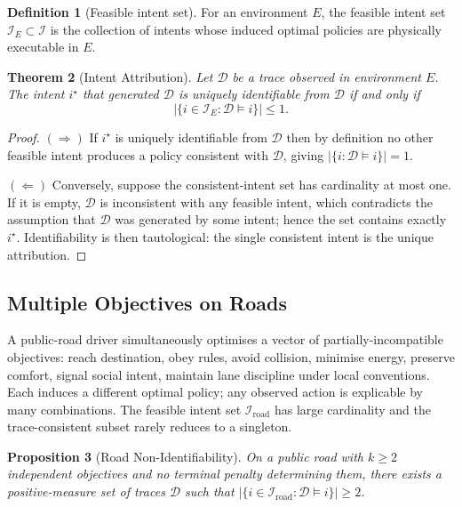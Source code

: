 \documentclass[11pt,twocolumn]{article}
\newtheorem{theorem}{Theorem}
\newtheorem{proposition}[theorem]{Proposition}
\theoremstyle{definition}
\newtheorem{definition}[theorem]{Definition}
\theoremstyle{remark}
\newcommand{\cI}{\mathcal{I}}
\begin{document}
\begin{definition}[Feasible intent set]\label{def:feasible-intents}
For an environment $E$, the feasible intent set $\cI_E \subset \cI$ is the collection of intents whose induced optimal policies are physically executable in $E$.
\end{definition}

\begin{theorem}[Intent Attribution]\label{thm:intent}
Let $\mathcal{D}$ be a trace observed in environment $E$. The intent $i^{\star}$ that generated $\mathcal{D}$ is uniquely identifiable from $\mathcal{D}$ if and only if
\begin{equation}
|\{i \in \cI_E : \mathcal{D} \models i\}| \le 1.
\end{equation}
\end{theorem}

\begin{proof}
$(\Rightarrow)$ If $i^{\star}$ is uniquely identifiable from $\mathcal{D}$ then by definition no other feasible intent produces a policy consistent with $\mathcal{D}$, giving $|\{i : \mathcal{D} \models i\}| = 1$.

$(\Leftarrow)$ Conversely, suppose the consistent-intent set has cardinality at most one. If it is empty, $\mathcal{D}$ is inconsistent with any feasible intent, which contradicts the assumption that $\mathcal{D}$ was generated by some intent; hence the set contains exactly $i^{\star}$. Identifiability is then tautological: the single consistent intent is the unique attribution.
\end{proof}

\subsection{Multiple Objectives on Roads}

A public-road driver simultaneously optimises a vector of partially-incompatible objectives: reach destination, obey rules, avoid collision, minimise energy, preserve comfort, signal social intent, maintain lane discipline under local conventions. Each induces a different optimal policy; any observed action is explicable by many combinations. The feasible intent set $\cI_{\mathrm{road}}$ has large cardinality and the trace-consistent subset rarely reduces to a singleton.

\begin{proposition}[Road Non-Identifiability]\label{prop:road-noid}
On a public road with $k \ge 2$ independent objectives and no terminal penalty determining them, there exists a positive-measure set of traces $\mathcal{D}$ such that $|\{i \in \cI_{\mathrm{road}} : \mathcal{D} \models i\}| \ge 2$.
\end{proposition}
\end{document}
